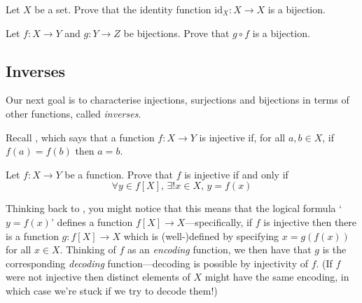 \begin{exercise}

Let $X$ be a set. Prove that the identity function $\mathrm{id}_X : X \to X$ is a bijection.
%
\end{exercise}

\begin{exercise}
\label{exCompositeOfBijectionsIsBijection}
Let $f : X \to Y$ and $g : Y \to Z$ be bijections. Prove that $g \circ f$ is a bijection.
\end{exercise}

\subsection*{Inverses}

Our next goal is to characterise injections, surjections and bijections in terms of other functions, called \textit{inverses}.

Recall , which says that a function $f : X \to Y$ is injective if, for all $a,b \in X$, if $f(a)=f(b)$ then $a=b$.

\begin{exercise}
Let $f : X \to Y$ be a function. Prove that $f$ is injective if and only if
\[ \forall y \in f[X],\, \exists ! x \in X,\, y=f(x) \]
\end{exercise}

Thinking back to , you might notice that this means that the logical formula `$y=f(x)$' defines a function $f[X] \to X$---specifically, if $f$ is injective then there is a function $g : f[X] \to X$ which is (well-)defined by specifying $x=g(f(x))$ for all $x \in X$. Thinking of $f$ as an \textit{encoding} function, we then have that $g$ is the corresponding \textit{decoding} function---decoding is possible by injectivity of $f$. (If $f$ were not injective then distinct elements of $X$ might have the same encoding, in which case we're stuck if we try to decode them!)

